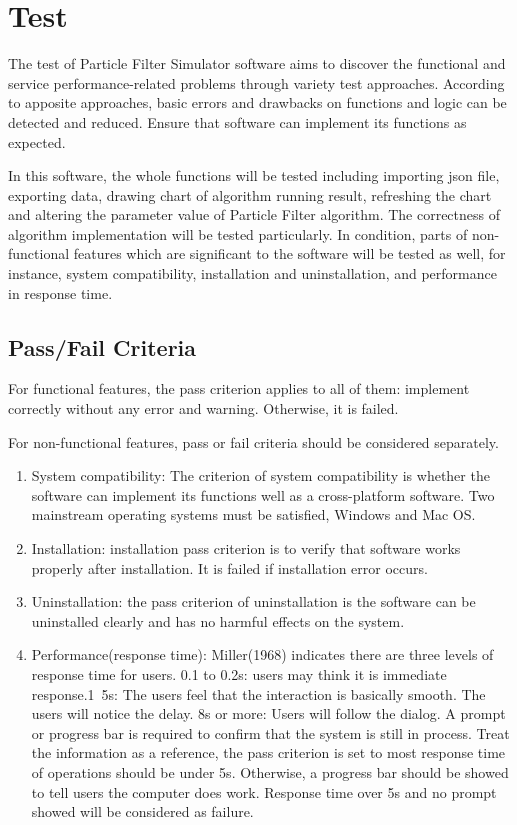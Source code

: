 \documentclass[11pt,oneside,a4paper]{article}
\begin{document}
\section{Test}
The test of Particle Filter Simulator software aims to discover the functional and service performance-related problems through variety test approaches. According to apposite approaches, basic errors and drawbacks on functions and logic can be detected and reduced.   Ensure that software can implement its functions as expected.

In this software, the whole functions will be tested including importing json file, exporting data, drawing chart of algorithm running  result, refreshing the chart and altering the parameter value of Particle Filter algorithm. The correctness of algorithm implementation will be tested particularly. In condition, parts of non-functional features which are significant to the software will be tested as well, for instance, system compatibility, installation and uninstallation, and performance in response time.
\subsection{Pass/Fail Criteria}
For functional features, the pass criterion applies to all of them: implement correctly without any error and warning. Otherwise, it is failed.

For non-functional features, pass or fail criteria should be considered separately.
\begin{enumerate}
  \item System compatibility: The criterion of system compatibility is whether the software can implement its functions well as a cross-platform software. Two mainstream operating systems must be satisfied, Windows and Mac OS.
  \item Installation: installation pass criterion is to verify that software works properly after installation. It is failed if installation error occurs.
  \item Uninstallation: the pass criterion of uninstallation is the software can be uninstalled clearly and has no harmful effects on the system.
  \item Performance(response time): Miller(1968) indicates there are three levels of response time for users. 0.1 to 0.2s: users may think it is immediate response.1~5s: The users feel that the interaction is basically smooth. The users will notice the delay. 8s or more: Users will follow the dialog. A prompt or progress bar is required to confirm that the system is still in process. Treat the information as a reference, the pass criterion is set to most response time of operations should be under 5s. Otherwise, a progress bar should be showed to tell users the computer does work. Response time over 5s and no prompt showed will be considered as failure.

\end{enumerate}
\end{document}
